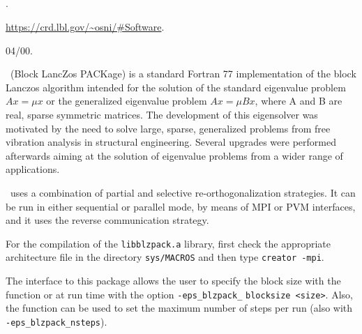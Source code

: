 \subsection*{\underline{\blzpack}}
	\begin{description}
	\setlength{\itemsep}{0pt}
	\item[References.]\citep{Marques:1995:BDU}.
	\item[Website.] \url{https://crd.lbl.gov/\~osni/\#Software}.
	\item[Version.] 04/00.
	\item[Summary.] \blzpack\ (Block LancZos PACKage) is a standard Fortran 77 implementation of the block Lanczos algorithm intended for the solution of the standard eigenvalue problem $Ax=\mu x$ or the generalized eigenvalue problem $Ax=\mu Bx$, where A and B are real, sparse symmetric matrices. The development of this eigensolver was motivated by the need to solve large, sparse, generalized problems from free vibration analysis in structural engineering. Several upgrades were performed afterwards aiming at the solution of eigenvalue problems from a wider range of applications.

	\blzpack\ uses a combination of partial and selective re-orthogonalization strategies. It can be run in either sequential or parallel mode, by means of MPI or PVM interfaces, and it uses the reverse communication strategy.
	\item[Installation.] For the compilation of the \texttt{libblzpack.a} library, first check the appropriate architecture file in the directory \texttt{sys/MACROS} and then type \texttt{creator -mpi}.
	\item[Specific options.] The \slepc interface to this package allows the user to specify the block size with the function  or at run time with the option \Verb!-eps_blzpack_! \Verb!blocksize <size>!. Also, the function  can be used to set the maximum number of steps per run (also with \Verb!-eps_blzpack_nsteps!).
	\end{description}

